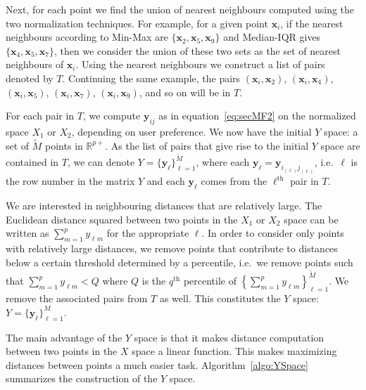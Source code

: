 \documentclass[a4paper,11pt]{article}
\begin{document}
Next, for each point we find the union of nearest neighbours computed using the two normalization techniques. For example, for a given point $\bm{x}_i$, if the nearest neighbours according to Min-Max are $\{\bm{x}_2, \bm{x}_5, \bm{x}_9 \}$ and Median-IQR gives $\{\bm{x}_4, \bm{x}_5, \bm{x}_7 \}$, then we consider the union of these two sets as the set of nearest neighbours of $\bm{x}_i$. Using the nearest neighbours we construct a list of pairs denoted by $T$. Continuing the same example, the pairs $(\bm{x}_i, \bm{x}_2)$, $(\bm{x}_i, \bm{x}_4)$, $(\bm{x}_i, \bm{x}_5)$, $(\bm{x}_i, \bm{x}_7)$, $(\bm{x}_i, \bm{x}_9)$, and so on will be in $T$.

For each pair in $T$, we compute $\bm{y}_{ij}$ as in equation~\eqref{eq:secMF2} on the normalized space $X_1$ or $X_2$, depending on user preference. We now have the initial $Y$ space: a set of $\tilde{M}$ points in $\mathbb{R}^{p+}$. As the list of pairs that give rise to the initial $Y$ space are contained in $T$, we can denote $Y = \{ \bm{y}_\ell \}_{\ell=1}^{\tilde{M}}$, where each $\bm{y}_\ell = \bm{y}_{i_{(\ell)} j_{(\ell)} }$, i.e.\ $\ell$ is the row number in the matrix $Y$ and each $\bm{y}_\ell$ comes from the $\ell^{\text{th}}$ pair in $T$.

We are interested in neighbouring distances that are relatively large. The Euclidean distance squared between two points in the $X_1$ or $X_2$ space can be written as $\sum_{m=1}^p y_{\ell m}$ for the appropriate $\ell$. In order to consider only points with relatively large distances, we remove points that contribute to distances below a certain threshold determined by a percentile, i.e.\ we remove points such that $\sum_{m=1}^p y_{\ell m} < Q$ where $Q$ is the $q^{\text{th}}$ percentile of $ \left \{\sum_{m=1}^p y_{\ell m} \right \}_{\ell=1}^{\tilde{M}}$. We remove the associated pairs from $T$ as well. This constitutes the $Y$ space: $Y = \{\bm{y}_\ell \}_{\ell=1}^M$.

The main advantage of the $Y$ space is that it makes distance computation between two points in the $X$ space a linear function. This makes maximizing distances between points a much easier task.
Algorithm~\ref{algo:YSpace} summarizes the construction of the $Y$ space.
\end{document}
